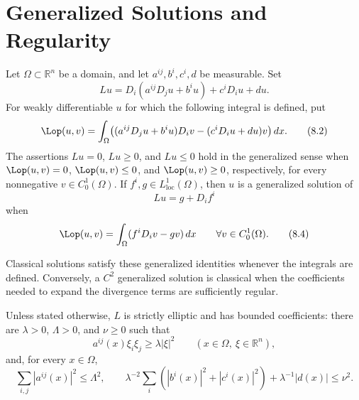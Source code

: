 \chapter{Generalized Solutions and Regularity}

\begin{definition}
\label{gt-def-8-divergence-form-generalized-solution}
Let $\Omega\subset\mathbb R^n$ be a domain, and let $a^{ij},b^i,c^i,d$ be
measurable. Set
\begin{equation}
Lu=D_i(a^{ij}D_j u+b^iu)+c^iD_i u+du.
\tag{8.1}
\end{equation}
For weakly differentiable $u$ for which the following integral is defined, put
\begin{equation}
\Lop(u,v)=\int_\Omega\bigl((a^{ij}D_j u+b^iu)D_i v
 -(c^iD_i u+du)v\bigr)\,dx.
\tag{8.2}
\end{equation}
The assertions $Lu=0$, $Lu\geq0$, and $Lu\leq0$ hold in the generalized sense
when $\Lop(u,v)=0$, $\Lop(u,v)\leq0$, and $\Lop(u,v)\geq0$, respectively, for
every nonnegative $v\in C_0^1(\Omega)$. If $f^i,g\in L^1_{\mathrm{loc}}(\Omega)$,
then $u$ is a generalized solution of
\begin{equation}
Lu=g+D_if^i
\tag{8.3}
\end{equation}
when
\begin{equation}
\Lop(u,v)=\int_\Omega(f^iD_iv-gv)\,dx
\qquad\forall v\in C_0^1(\Omega).
\tag{8.4}
\end{equation}
\end{definition}

\begin{remark}
\label{gt-rem-8-classical-generalized-equivalence}
Classical solutions satisfy these generalized identities whenever the integrals
are defined. Conversely, a $C^2$ generalized solution is classical when the
coefficients needed to expand the divergence terms are sufficiently regular.
\end{remark}

\begin{convention}
\label{gt-conv-8-ellipticity-coefficient-bounds}
Unless stated otherwise, $L$ is strictly elliptic and has bounded coefficients:
there are $\lambda>0$, $\Lambda>0$, and $\nu\geq0$ such that
\begin{equation}
a^{ij}(x)\xi_i\xi_j\geq\lambda|\xi|^2
\qquad(x\in\Omega,\ \xi\in\mathbb R^n),
\tag{8.5}
\end{equation}
and, for every $x\in\Omega$,
\begin{equation}
\sum_{i,j}|a^{ij}(x)|^2\leq\Lambda^2,
\qquad
\lambda^{-2}\sum_i(|b^i(x)|^2+|c^i(x)|^2)
 +\lambda^{-1}|d(x)|\leq\nu^2.
\tag{8.6}
\end{equation}
\end{convention}

